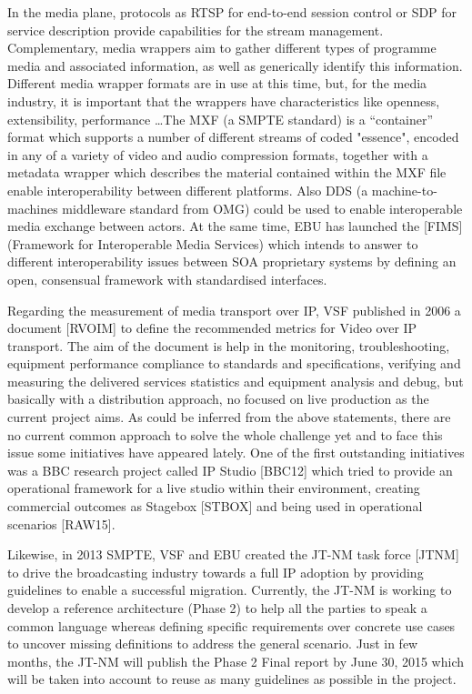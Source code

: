 In the media plane, protocols as RTSP for end-to-end session control or SDP for service description
provide capabilities for the stream management. Complementary, media wrappers aim to gather
different types of programme media and associated information, as well as generically identify this
information. Different media wrapper formats are in use at this time, but, for the media industry, it is
important that the wrappers have characteristics like openness, extensibility, performance \ldots The MXF (a SMPTE standard) is a “container” format which supports a number of different streams of coded
"essence", encoded in any of a variety of video and audio compression formats, together with a
metadata wrapper which describes the material contained within the MXF file enable interoperability
between different platforms. Also DDS (a machine-to-machines middleware standard from OMG)
could be used to enable interoperable media exchange between actors. At the same time, EBU has
launched the [FIMS] (Framework for Interoperable Media Services) which intends to answer to
different interoperability issues between SOA proprietary systems by defining an open, consensual
framework with standardised interfaces.

Regarding the measurement of media transport over IP, VSF published in 2006 a document [RVOIM]
to define the recommended metrics for Video over IP transport. The aim of the document is help in
the monitoring, troubleshooting, equipment performance compliance to standards and specifications,
verifying and measuring the delivered services statistics and equipment analysis and debug, but
basically with a distribution approach, no focused on live production as the current project aims.
As could be inferred from the above statements, there are no current common approach to solve the
whole challenge yet and to face this issue some initiatives have appeared lately. One of the first
outstanding initiatives was a BBC research project called IP Studio [BBC12] which tried to provide
an operational framework for a live studio within their environment, creating commercial outcomes
as Stagebox [STBOX] and being used in operational scenarios [RAW15].

Likewise, in 2013 SMPTE, VSF and EBU created the JT-NM task force [JTNM] to drive the
broadcasting industry towards a full IP adoption by providing guidelines to enable a successful
migration. Currently, the JT-NM is working to develop a reference architecture (Phase 2) to help all
the parties to speak a common language whereas defining specific requirements over concrete use
cases to uncover missing definitions to address the general scenario. Just in few months, the JT-NM
will publish the Phase 2 Final report by June 30, 2015 which will be taken into account to reuse as
many guidelines as possible in the project.

